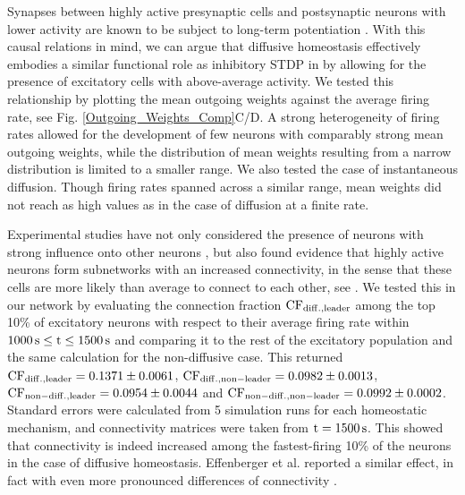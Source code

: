 \documentclass[10pt,letterpaper]{article}
\begin{document}
Synapses between highly active presynaptic cells and postsynaptic neurons with lower activity are known to be subject to long-term potentiation \cite{Sjoestroem_Syn_Plasticity_2001,Feldman_STDP_2012}. With this causal relations in mind, we can argue that diffusive homeostasis effectively embodies a similar functional role as inhibitory STDP in \cite{Effenberger_2015} by allowing for the presence of excitatory cells with above-average activity. We tested this relationship by plotting the mean outgoing weights against the average firing rate, see Fig. \ref{Outgoing_Weights_Comp}C/D. A strong heterogeneity of firing rates allowed for the development of few neurons with comparably strong mean outgoing weights, while the distribution of mean weights resulting from a narrow distribution is limited to a smaller range. We also tested the case of instantaneous diffusion. Though firing rates spanned across a similar range, mean weights did not reach as high values as in the case of diffusion at a finite rate.

Experimental studies have not only considered the presence of neurons with strong influence onto other neurons \cite{Eckmann_Leader_Neurons_2008}, but also found evidence that highly active neurons form subnetworks with an increased connectivity, in the sense that these cells are more likely than average to connect to each other, see \cite{Yassin_Subnetworks_2010}. We tested this in our network by evaluating the connection fraction $\rm CF_{diff.,leader}$ among the top 10\% of excitatory neurons with respect to their average firing rate within $\rm 1000\,s \leq t \leq 1500\,s$ and comparing it to the rest of the excitatory population and the same calculation for the non-diffusive case. This returned $\rm CF_{diff.,leader} = 0.1371 \pm 0.0061$, $\rm CF_{diff.,non-leader} = 0.0982 \pm 0.0013$, $\rm CF_{non-diff.,leader} = 0.0954 \pm 0.0044$ and $\rm CF_{non-diff.,non-leader} = 0.0992 \pm 0.0002$. Standard errors were calculated from 5 simulation runs for each homeostatic mechanism, and connectivity matrices were taken from $\rm t = 1500\,s$. This showed that connectivity is indeed increased among the fastest-firing 10\% of the neurons in the case of diffusive homeostasis. Effenberger et al. reported a similar effect, in fact with even more pronounced differences of connectivity \cite{Effenberger_2015}.
\end{document}
